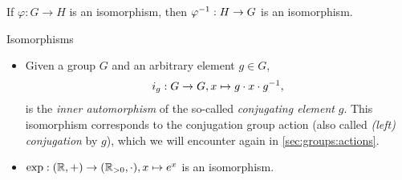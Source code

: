 \begin{rmk}
If $\varphi : G \to H$ is an isomorphism, then $\varphi^{-1} : H \to G$ is an isomorphism.
\end{rmk}

\begin{ex}{Isomorphisms}{}
\begin{itemize}
    \item Given a group $G$ and an arbitrary element $g \in G$, \begin{align}
        i_g : G \to G, x \mapsto g \cdot x \cdot g^{-1},
    \end{align} is the \emph{inner automorphism} of the so-called \emph{conjugating element} $g$. This isomorphism corresponds to the conjugation group action (also called \emph{(left) conjugation} by $g$), which we will encounter again in \cref{sec:groups:actions}.
    
    \item $\exp : (\mathbb{R},+) \to (\mathbb{R}_{>0},\cdot), x \mapsto e^x$ is an isomorphism.
\end{itemize}
\end{ex}